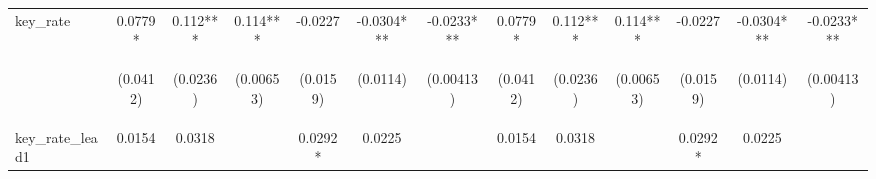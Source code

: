 \documentclass[]{article}
\begin{document}
\begin{center}
\begin{tabular}{lcccccccccccc}
key\_rate & 0.0779* & 0.112*** & 0.114*** & -0.0227 & -0.0304*** & -0.0233*** & 0.0779* & 0.112*** & 0.114*** & -0.0227 & -0.0304*** & -0.0233*** \\
\vspace{4pt} & \begin{footnotesize}(0.0412)\end{footnotesize} & \begin{footnotesize}(0.0236)\end{footnotesize} & \begin{footnotesize}(0.00653)\end{footnotesize} & \begin{footnotesize}(0.0159)\end{footnotesize} & \begin{footnotesize}(0.0114)\end{footnotesize} & \begin{footnotesize}(0.00413)\end{footnotesize} & \begin{footnotesize}(0.0412)\end{footnotesize} & \begin{footnotesize}(0.0236)\end{footnotesize} & \begin{footnotesize}(0.00653)\end{footnotesize} & \begin{footnotesize}(0.0159)\end{footnotesize} & \begin{footnotesize}(0.0114)\end{footnotesize} & \begin{footnotesize}(0.00413)\end{footnotesize} \\
key\_rate\_lead1 & 0.0154 & 0.0318 &  & 0.0292* & 0.0225 &  & 0.0154 & 0.0318 &  & 0.0292* & 0.0225 &  \\

\end{tabular}
\end{center}
\end{document}
